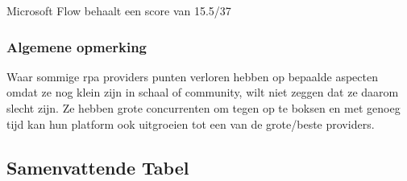 Microsoft Flow behaalt een score van 15.5/37


\subsubsection{Algemene opmerking}
Waar sommige \acrshort{rpa} providers punten verloren hebben op bepaalde aspecten omdat ze nog klein zijn in schaal of community, wilt niet zeggen dat ze daarom slecht zijn. Ze hebben grote concurrenten om tegen op te boksen en met genoeg tijd kan hun platform ook uitgroeien tot een van de grote/beste providers.

\subsection{Samenvattende Tabel}
